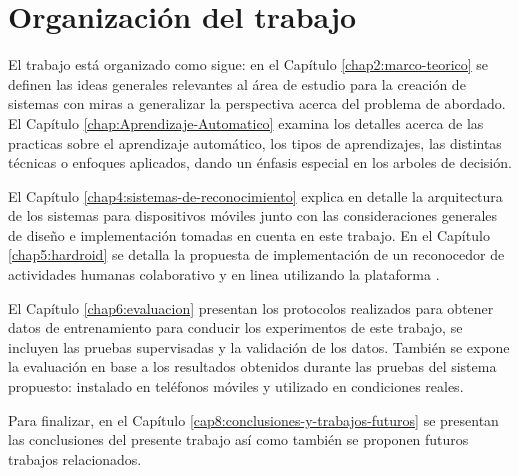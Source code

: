 \section{Organización del trabajo}

\label{sec14:organizaciuxf3n-del-trabajo}El trabajo está organizado
como sigue: en el Capítulo \ref{chap2:marco-teorico} se definen las
ideas generales relevantes al área de estudio para la creación de
sistemas  con miras a generalizar la perspectiva acerca
del problema de abordado. El Capítulo \ref{chap:Aprendizaje-Automatico}
examina los detalles acerca de las practicas sobre el aprendizaje
automático, los tipos de aprendizajes, las distintas técnicas o enfoques
aplicados, dando un énfasis especial en los arboles de decisión. 

El Capítulo \ref{chap4:sistemas-de-reconocimiento} explica en detalle
la arquitectura de los sistemas  para dispositivos móviles
junto con las consideraciones generales de diseño e implementación
tomadas en cuenta en este trabajo. En el Capítulo \ref{chap5:hardroid}
se detalla la propuesta de implementación de un reconocedor de actividades
humanas colaborativo y en linea utilizando la plataforma .

El Capítulo \ref{chap6:evaluacion} presentan los protocolos realizados
para obtener datos de entrenamiento para conducir los experimentos
de este trabajo, se incluyen las pruebas supervisadas y la validación
de los datos. También se expone la evaluación en base a los resultados
obtenidos durante las pruebas del sistema  propuesto: instalado
en teléfonos móviles y utilizado en condiciones reales. 

Para finalizar, en el Capítulo \ref{cap8:conclusiones-y-trabajos-futuros}
se presentan las conclusiones del presente trabajo así como también
se proponen futuros trabajos relacionados. 
